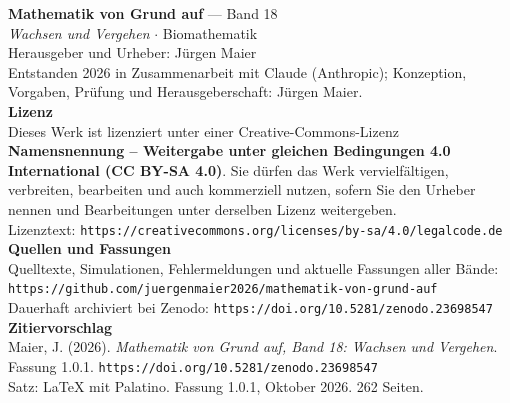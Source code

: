 \thispagestyle{empty}
\vspace*{\fill}
\begin{flushleft}
{\small\color{grau}
\textbf{\color{tief}Mathematik von Grund auf} --- Band 18\\[2pt]
\textit{Wachsen und Vergehen} $\cdot$ Biomathematik\\[14pt]

Herausgeber und Urheber: Jürgen Maier\\[2pt]
Entstanden 2026 in Zusammenarbeit mit Claude (Anthropic); Konzeption, Vorgaben, Prüfung und Herausgeberschaft: Jürgen Maier.\\[14pt]

\textbf{Lizenz}\\[2pt]
Dieses Werk ist lizenziert unter einer Creative-Commons-Lizenz \textbf{Namensnennung -- Weitergabe unter gleichen Bedingungen 4.0 International (CC BY-SA 4.0)}. Sie dürfen das Werk vervielfältigen, verbreiten, bearbeiten und auch kommerziell nutzen, sofern Sie den Urheber nennen und Bearbeitungen unter derselben Lizenz weitergeben.\\[2pt]
Lizenztext: \texttt{https://creativecommons.org/licenses/by-sa/4.0/legalcode.de}\\[14pt]

\textbf{Quellen und Fassungen}\\[2pt]
Quelltexte, Simulationen, Fehlermeldungen und aktuelle Fassungen aller Bände:\\
\texttt{https://github.com/juergenmaier2026/mathematik-von-grund-auf}\\[2pt]
Dauerhaft archiviert bei Zenodo: \texttt{https://doi.org/10.5281/zenodo.23698547}\\[14pt]

\textbf{Zitiervorschlag}\\[2pt]
Maier, J. (2026). \textit{Mathematik von Grund auf, Band 18: Wachsen und Vergehen}. Fassung 1.0.1. \texttt{https://doi.org/10.5281/zenodo.23698547}\\[14pt]

Satz: \LaTeX{} mit Palatino. Fassung 1.0.1, Oktober 2026. 262 Seiten.
}
\end{flushleft}
\vspace*{1.5cm}
